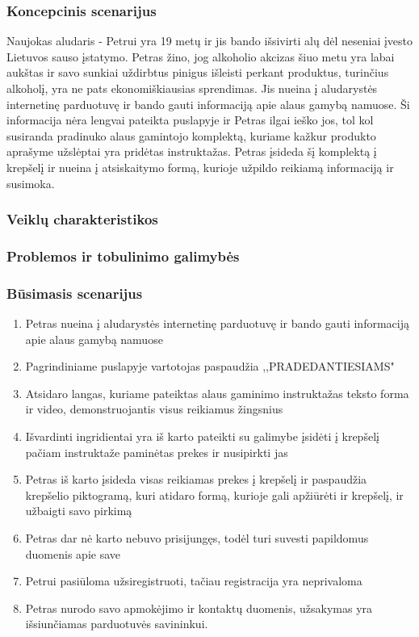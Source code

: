 \documentclass[oneside]{VUMIFPSkursinis}
\begin{document}
		\subsubsection{Koncepcinis scenarijus}
			Naujokas aludaris - Petrui yra 19 metų ir jis bando išsivirti alų dėl neseniai įvesto Lietuvos sauso įstatymo.
			Petras žino, jog alkoholio akcizas šiuo metu yra labai aukštas ir savo sunkiai uždirbtus pinigus išleisti perkant produktus, turinčius alkoholį, yra ne pats ekonomiškiausias sprendimas.
			Jis nueina į aludarystės internetinę parduotuvę ir bando gauti informaciją apie alaus gamybą namuose.
			Ši informacija nėra lengvai pateikta puslapyje ir Petras ilgai ieško jos, tol kol susiranda pradinuko alaus gamintojo komplektą, kuriame kažkur produkto aprašyme užslėptai yra pridėtas instruktažas.
			Petras įsideda šį komplektą į krepšelį ir nueina į atsiskaitymo formą, kurioje užpildo reikiamą informaciją ir susimoka.
		\subsubsection{Veiklų charakteristikos}
		\subsubsection{Problemos ir tobulinimo galimybės}
		\subsubsection{Būsimasis scenarijus}
			\begin{enumerate}
				\item{Petras nueina į aludarystės internetinę parduotuvę ir bando gauti informaciją apie alaus gamybą namuose}
				\item{Pagrindiniame puslapyje vartotojas paspaudžia ,,PRADEDANTIESIAMS"}
				\item{Atsidaro langas, kuriame pateiktas alaus gaminimo instruktažas teksto forma ir video, demonstruojantis visus reikiamus žingsnius}
				\item{Išvardinti ingridientai yra iš karto pateikti su galimybe įsidėti į krepšelį pačiam instruktaže paminėtas prekes ir nusipirkti jas}
				\item{Petras iš karto įsideda visas reikiamas prekes į krepšelį ir paspaudžia krepšelio piktogramą, kuri atidaro formą, kurioje gali apžiūrėti ir krepšelį, ir užbaigti savo pirkimą}
				\item{Petras dar nė karto nebuvo prisijungęs, todėl turi suvesti papildomus duomenis apie save}
				\item{Petrui pasiūloma užsiregistruoti, tačiau registracija yra neprivaloma}
				\item{Petras nurodo savo apmokėjimo ir kontaktų duomenis, užsakymas yra išsiunčiamas parduotuvės savininkui.}
			\end{enumerate}
\end{document}
